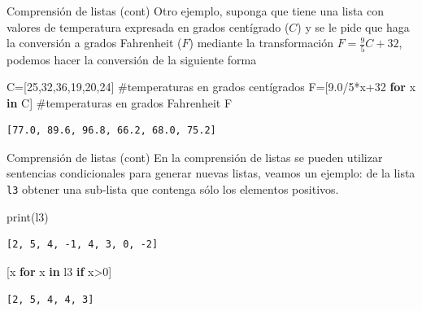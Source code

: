 \documentclass[
  ignorenonframetext,
  aspectratio=169,
  spanish,
]{beamer}
\newenvironment{Shaded}{\begin{snugshade}}{\end{snugshade}}
\newcommand{\BuiltInTok}[1]{\textcolor[rgb]{0.00,0.23,0.31}{#1}}
\newcommand{\CommentTok}[1]{\textcolor[rgb]{0.37,0.37,0.37}{#1}}
\newcommand{\ControlFlowTok}[1]{\textcolor[rgb]{0.00,0.23,0.31}{\textbf{#1}}}
\newcommand{\DecValTok}[1]{\textcolor[rgb]{0.68,0.00,0.00}{#1}}
\newcommand{\FloatTok}[1]{\textcolor[rgb]{0.68,0.00,0.00}{#1}}
\newcommand{\KeywordTok}[1]{\textcolor[rgb]{0.00,0.23,0.31}{\textbf{#1}}}
\newcommand{\NormalTok}[1]{\textcolor[rgb]{0.00,0.23,0.31}{#1}}
\newcommand{\OperatorTok}[1]{\textcolor[rgb]{0.37,0.37,0.37}{#1}}
\begin{document}
\begin{frame}[fragile]{Comprensión de listas (cont)}
\label{comprensiuxf3n-de-listas-cont}
Otro ejemplo, suponga que tiene una lista con valores de temperatura
expresada en grados centígrado (\(C\)) y se le pide que haga la
conversión a grados Fahrenheit (\(F\)) mediante la transformación
\(F=\frac 9 5 C+32\), podemos hacer la conversión de la siguiente forma

\begin{Shaded}
\begin{Highlighting}[]
\NormalTok{C}\OperatorTok{=}\NormalTok{[}\DecValTok{25}\NormalTok{,}\DecValTok{32}\NormalTok{,}\DecValTok{36}\NormalTok{,}\DecValTok{19}\NormalTok{,}\DecValTok{20}\NormalTok{,}\DecValTok{24}\NormalTok{] }\CommentTok{\#temperaturas en grados centígrados}
\NormalTok{F}\OperatorTok{=}\NormalTok{[}\FloatTok{9.0}\OperatorTok{/}\DecValTok{5}\OperatorTok{*}\NormalTok{x}\OperatorTok{+}\DecValTok{32} \ControlFlowTok{for}\NormalTok{ x }\KeywordTok{in}\NormalTok{ C] }\CommentTok{\#temperaturas en grados Fahrenheit}
\NormalTok{F}
\end{Highlighting}
\end{Shaded}

\begin{verbatim}
[77.0, 89.6, 96.8, 66.2, 68.0, 75.2]
\end{verbatim}
\end{frame}

\begin{frame}[fragile]{Comprensión de listas (cont)}
\label{comprensiuxf3n-de-listas-cont-1}
En la comprensión de listas se pueden utilizar sentencias condicionales
para generar nuevas listas, veamos un ejemplo: de la lista \texttt{l3}
obtener una sub-lista que contenga sólo los elementos positivos.

\begin{Shaded}
\begin{Highlighting}[]
\BuiltInTok{print}\NormalTok{(l3) }
\end{Highlighting}
\end{Shaded}

\begin{verbatim}
[2, 5, 4, -1, 4, 3, 0, -2]
\end{verbatim}

\begin{Shaded}
\begin{Highlighting}[]
\NormalTok{[x }\ControlFlowTok{for}\NormalTok{ x }\KeywordTok{in}\NormalTok{ l3 }\ControlFlowTok{if}\NormalTok{ x}\OperatorTok{\textgreater{}}\DecValTok{0}\NormalTok{]}
\end{Highlighting}
\end{Shaded}

\begin{verbatim}
[2, 5, 4, 4, 3]
\end{verbatim}
\end{frame}
\end{document}
